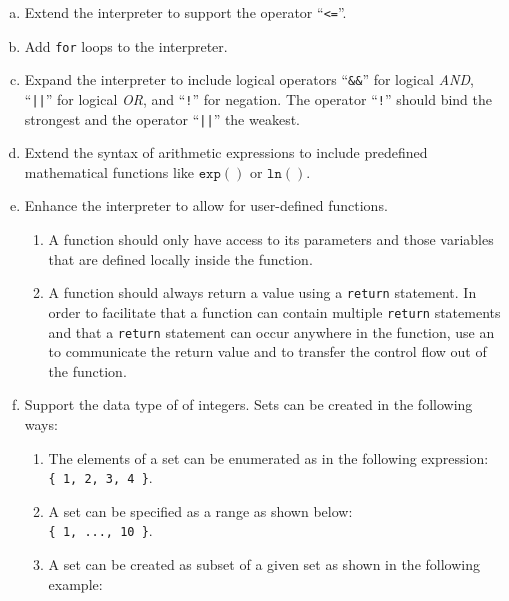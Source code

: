 \exerciseEng
\begin{enumerate}[(a)]
\item Extend the interpreter to support the operator ``\texttt{<=}''.
\item Add \texttt{for} loops to the interpreter.
\item Expand the interpreter to include logical operators
      ``\texttt{\&\&}'' for logical \emph{AND}, ``\texttt{||}'' for logical \emph{OR},
      and ``\texttt{!}'' for negation. The operator ``\texttt{!}'' should bind the
      strongest and the operator ``\texttt{||}'' the weakest.
\item Extend the syntax of arithmetic expressions to include predefined
      mathematical functions like $\texttt{exp}()$ or $\texttt{ln}()$.
\item Enhance the interpreter to allow for user-defined functions.
      \begin{enumerate}
      \item A function should only have access to its parameters and those variables that
            are defined locally inside the function.  
      \item A function should always return a value using a \texttt{return} statement.
            In order to facilitate that a function can contain multiple \texttt{return}
            statements and that a \texttt{return} statement can occur
            anywhere in the function,  use an  to communicate the
            return value and to transfer the control flow out of the function.
      \end{enumerate}
\item Support the data type of  of integers.  Sets can be created in the following ways:
      \begin{enumerate}[1.]
      \item The elements of a set can be enumerated as in the following  expression:
            \\[0.2cm]
            \hspace*{1.3cm}
            \texttt{\{ 1, 2, 3, 4 \}}.
      \item A set can be specified as a range as shown below:
            \\[0.2cm]
            \hspace*{1.3cm}
            \texttt{\{ 1, ..., 10 \}}.
      \item A set can be created as subset of a given set as shown in the following example:
            \\[0.2cm]

\end{enumerate}
\end{enumerate}
